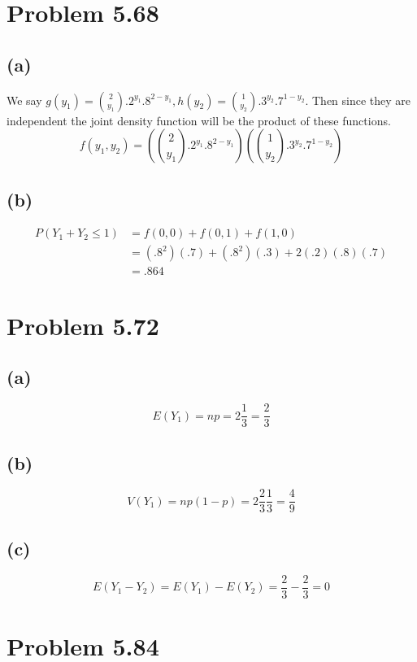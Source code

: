\documentclass{article}
\theoremstyle{definition}
\begin{document}
\section*{Problem 5.68}
    \subsection*{(a)}
        We say $g(y_1) = {2 \choose y_1}.2^{y_1} .8^{2 - y_1}, h(y_2) = {1 \choose y_2}.3^{y_2} .7^{1 - y_2}$.
        Then since they are independent the joint density function will be the product of these functions.
        \[
            f(y_1,y_2) = \left({2 \choose y_1}.2^{y_1} .8^{2 - y_1}\right)\left({1 \choose y_2}.3^{y_2} .7^{1 - y_2}\right)
        \]

    \subsection*{(b)}
        \begin{align*}
            P(Y_1 + Y_2 \leqslant 1) &= f(0,0) + f(0,1) + f(1,0) \\
            &= (.8^2)(.7) + (.8^2)(.3) + 2(.2)(.8)(.7) \\
            &= .864
        \end{align*}

\section*{Problem 5.72}
    
    \subsection*{(a)}
        \[
            E(Y_1) = np = 2\frac{1}{3} = \frac{2}{3}
        \]
    \subsection*{(b)}
        \[
            V(Y_1) = np(1-p) = 2 \frac{2}{3} \frac{1}{3} = \frac{4}{9}
        \]
    \subsection*{(c)}
        \[
            E(Y_1 - Y_2) = E(Y_1) - E(Y_2) = \frac{2}{3} - \frac{2}{3} = 0
        \]

\section*{Problem 5.84}
\end{document}

